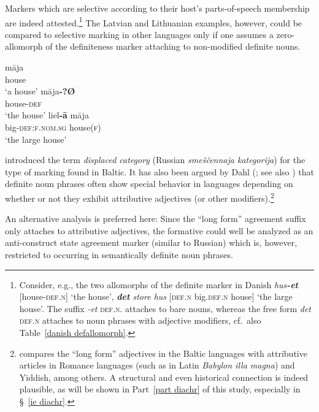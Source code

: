 Markers which are selective according to their host's parts-of-speech membership are indeed attested.\footnote{Consider, e.g., the two allomorphs of the definite marker in Danish \textit{hus\textbf{-et}} [house-\textsc{def.n}] ‘the house’, \textit{\textbf{det} store hus} [\textsc{def.n} big\textsc{.def.n} house] ‘the large house’. The suffix \textit{-et} \textsc{def.n.} attaches to bare nouns, whereas the free form \textit{det} \textsc{def.n} attaches to noun phrases with adjective modifiers, cf.~also Table~\ref{danish defallomorph}.} The Latvian and Lithuanian examples, however, could be compared to selective marking in other languages only if one assumes a zero-allomorph of the definiteness marker attaching to non-modified definite nouns.
\begin{exe}
\ex
{}
\begin{xlist}
\ex
\gll 	māja\\
	house\\
\glt	‘a house’
\ex	
\gll 	māja\textbf{-?Ø}\\
	house-\textsc{def}\\
\glt	‘the house’
\ex		
\gll 	liel\textbf{-ā} māja\\
	big-\textsc{def:f.nom.sg} house(\textsc{f})\\
\glt	‘the large house’
\end{xlist}
\end{exe}
\citet[31]{melcuk1998} introduced the term \emph{displaced category} (Russian \emph{smeščennaja kategorija}) for the type of marking found in Baltic. It has also been argued by Dahl (\citeyear[149–152]{dahl2003}; see also \citealt[122–123]{dahl2015a}) that definite noun phrases often show special behavior in languages depending on whether or not they exhibit attributive adjectives (or other modifiers).\footnote{\citet[150]{dahl2003} compares the “long form” adjectives in the Baltic languages with attributive articles in Romance languages (such as in Latin \textit{Babylon illa magna}) and Yiddish, among others. A structural and even historical connection is indeed plausible, as will be shown in Part~\ref{part diachr} of this study, especially in \S~\ref{ie diachr}.}

An alternative analysis is preferred here: Since the “long form” agreement suffix only attaches to attributive adjectives, the formative could well be analyzed as an anti\hyp{}construct state agreement marker (similar to Russian) which is, however, restricted to occurring in semantically definite noun phrases. 


